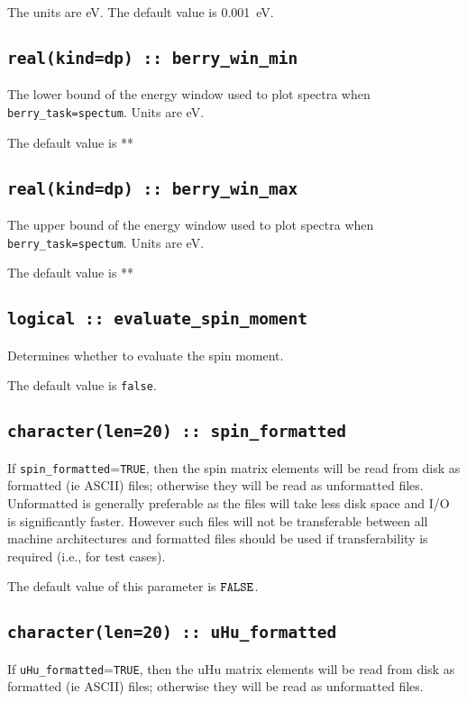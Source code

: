 The units are eV.
The default value is 0.001~eV.

\subsection[berry\_win\_min]{\tt real(kind=dp) :: berry\_win\_min}
The lower bound of the energy window  used to plot spectra when {\tt berry\_task=spectum}.
Units are eV.

The default value is **

\subsection[berry\_win\_max]{\tt real(kind=dp) :: berry\_win\_max}
The upper bound of the energy window used to plot spectra when {\tt berry\_task=spectum}.
Units are eV.

The default value is **


\subsection[evaluate\_spin\_moment]{\tt logical :: evaluate\_spin\_moment}
Determines whether to evaluate the spin moment.

The default value is \verb#false#.

\subsection[spin\_formated]{\tt character(len=20) :: spin\_formatted}

If \verb#spin_formatted#=\verb#TRUE#, then the spin matrix elements will be
read from disk as formatted (ie ASCII) files; otherwise they will be
read as unformatted files. Unformatted is generally preferable as the
files will take less disk space and I/O is significantly
faster. However such files will not be transferable between all
machine architectures and formatted files should be used if
transferability is required (i.e., for test cases).

The default value of this parameter is $\verb#FALSE#$.

\subsection[uHu\_formated]{\tt character(len=20) :: uHu\_formatted}

If \verb#uHu_formatted#=\verb#TRUE#, then the uHu matrix elements will be
read from disk as formatted (ie ASCII) files; otherwise they will be
read as unformatted files.

